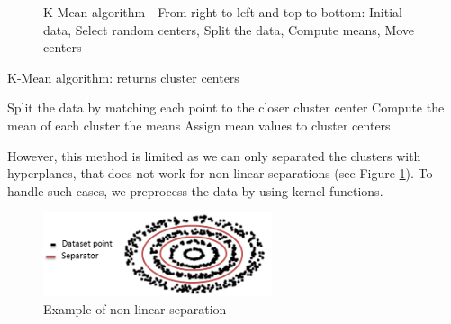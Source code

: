 \begin{figure}[h!]
\begin{center}
{}
\end{center}
\caption{K-Mean algorithm - From right to left and top to bottom: Initial data, Select random centers, Split the data, Compute means, Move centers}
\end{figure}
\begin{algorithm}
\caption{K-Mean algorithm: returns cluster centers}
\label{kmean}
\begin{algorithmic}
\Loop
\State Split the data by matching each point to the closer cluster center
\State Compute the mean of each cluster
\State \Return the means
\EndIf
\State Assign mean values to cluster centers 
\EndLoop
\end{algorithmic}
\end{algorithm}

However, this method is limited as we can only separated the clusters with hyperplanes, that does not work for non-linear separations (see Figure \ref{sepa}). To handle such cases, we preprocess the data by using kernel functions.
\begin{figure}
\includegraphics[width=0.6\textwidth]{Image/algo-sepa.png}\centering
\caption{Example of non linear separation\label{sepa}}
\end{figure}
